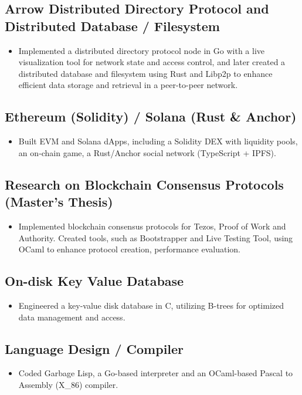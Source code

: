 \documentclass[a4paper, 12pt]{article}
\begin{document}
\subsection{Arrow Distributed Directory Protocol and Distributed Database / Filesystem}
\begin{itemize}
\item Implemented a distributed directory protocol node in Go with a live visualization tool for network state and access control, and later created a distributed database and filesystem using Rust and Libp2p to enhance efficient data storage and retrieval in a peer-to-peer network.
\end{itemize}

\subsection{Ethereum (Solidity) / Solana (Rust \& Anchor)}
\begin{itemize}
\item Built EVM and Solana dApps, including a Solidity DEX with liquidity pools, an on‑chain game, a Rust/Anchor social network (TypeScript + IPFS).
\end{itemize}

\subsection{Research on Blockchain Consensus Protocols (Master's Thesis)}
\begin{itemize}
  \item Implemented blockchain consensus protocols for Tezos, Proof of Work and Authority. Created tools, such as Bootstrapper and Live Testing Tool, using OCaml to enhance protocol creation, performance evaluation.
\end{itemize}


\subsection{On-disk Key Value Database}
\begin{itemize}
  \item Engineered a key-value disk database in C, utilizing B-trees for optimized data management and access.
\end{itemize}

\subsection{Language Design / Compiler}
\begin{itemize}
  \item Coded Garbage Lisp, a Go-based interpreter and an OCaml-based Pascal to Assembly (X\_86) compiler.
\end{itemize}
\end{document}
